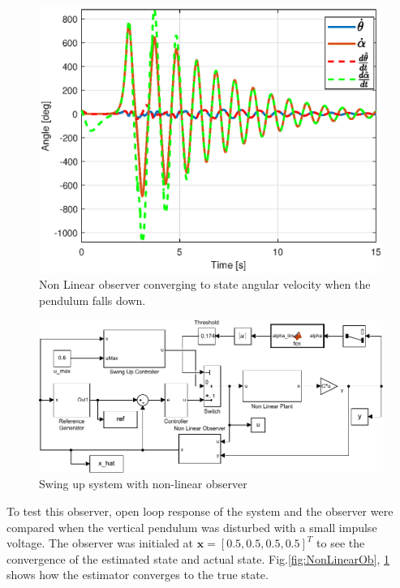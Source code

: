 \documentclass[superscriptaddress,floatfix,reprint,amssymb, amsmath,aps, pre]{revtex4-1}
\newcommand{\bx}{\textbf{x}}
\begin{document}
{{{            \begin{figure}
                \includegraphics[width = \linewidth]{NonLinearObVel.eps}
                \caption{Non Linear observer converging to state angular velocity when the pendulum falls down.}
                \label{fig:NonLinearObVel}
            \end{figure}

            \begin{figure}
                \includegraphics[width = \linewidth]{SwingUpSystemNonLin.pdf}
                \caption{Swing up system with non-linear observer}
                \label{fig:SwingUpSystemNonLin}
            \end{figure}

            To test this observer, open loop response of the system and the observer were compared when the vertical pendulum was disturbed with a small impulse voltage. The observer was initialed at \(\bx = [0.5,0.5,0.5,0.5]^T\) to see the convergence of the estimated state and actual state. Fig.\ref{fig:NonLinearOb}, \ref{fig:NonLinearObVel} shows how the estimator converges to the true state. 

}}}
\end{document}
